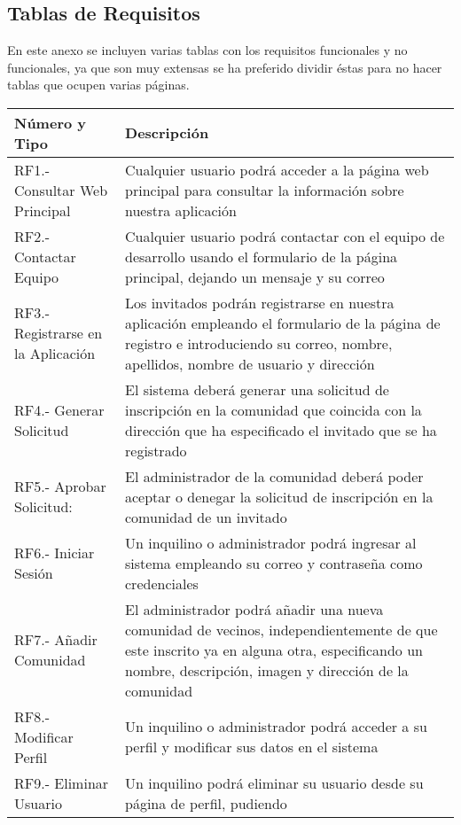 \begin{appendices}
\newpage

\section{Tablas de Requisitos}
\label{sec:apenB}
En este anexo se incluyen varias tablas con los requisitos funcionales y no funcionales, ya que son muy extensas se ha preferido dividir éstas para no hacer tablas que ocupen varias páginas.

\begin{table}[H]
	\begin{center}
		\bgroup
		\def\arraystretch{1.5}
		\begin{tabular}{| p{5cm} | p{10cm} |}
			\hline
			\textbf{Número y Tipo} & \textbf{Descripción}  \\ \hline
			RF1.- Consultar Web Principal &  Cualquier usuario podrá acceder a la página web principal para consultar la información sobre nuestra aplicación \\ \hline
			RF2.- Contactar Equipo & Cualquier usuario podrá contactar con el equipo de desarrollo usando
			el formulario de la página principal, dejando un mensaje y su correo \\ \hline
			RF3.- Registrarse en la Aplicación & Los invitados podrán registrarse en nuestra aplicación empleando el formulario de la página de registro e introduciendo su correo, nombre, apellidos, nombre
			de usuario y dirección  \\ \hline
			RF4.- Generar Solicitud & El sistema deberá generar una solicitud de inscripción en la comunidad que coincida con la dirección que ha especificado el invitado que se ha registrado  \\ \hline
			RF5.- Aprobar Solicitud: & El administrador de la comunidad deberá poder aceptar o denegar la
			solicitud de inscripción en la comunidad de un invitado  \\ \hline
			RF6.- Iniciar Sesión & Un inquilino o administrador podrá ingresar al sistema empleando su correo
			y contraseña como credenciales  \\ \hline
			RF7.- Añadir Comunidad & El administrador podrá añadir una nueva comunidad de vecinos, independientemente de que 
			este inscrito ya en alguna otra, especificando un nombre, descripción, imagen y dirección de la comunidad  \\ \hline
			RF8.- Modificar Perfil &  Un inquilino o administrador podrá acceder a su perfil y modificar sus datos
			en el sistema \\ \hline
			RF9.- Eliminar Usuario & Un inquilino podrá eliminar su usuario desde su página de perfil, pudiendo

\end{tabular}
\end{center}
\end{table}
\end{appendices}
